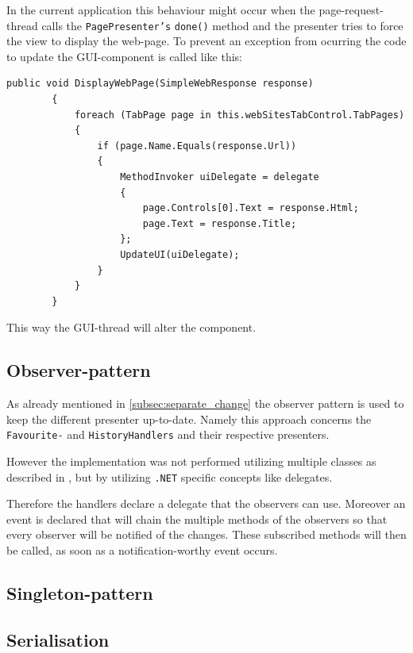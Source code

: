 In the current application this behaviour might occur when the page-request-thread calls the \texttt{PagePresenter's} \texttt{done()} method and the presenter tries to force the view to display the web-page.
To prevent an exception from ocurring the code to update the \ac{GUI}-component is called like this:

\begin{lstlisting}
public void DisplayWebPage(SimpleWebResponse response)
        {
            foreach (TabPage page in this.webSitesTabControl.TabPages)
            {
                if (page.Name.Equals(response.Url))
                {
                    MethodInvoker uiDelegate = delegate
                    {
                        page.Controls[0].Text = response.Html;
                        page.Text = response.Title;
                    };
                    UpdateUI(uiDelegate);
                }
            }
        }
\end{lstlisting}

This way the \ac{GUI}-thread will alter the component.

\subsection{Observer-pattern}

As already mentioned in \autoref{subsec:separate_change} the observer pattern is used to keep the different presenter up-to-date.
Namely this approach concerns the \texttt{Favourite-} and \texttt{HistoryHandlers} and their respective presenters.

However the implementation was not performed utilizing multiple classes as described in \textcite{gamma1994}, but by utilizing \texttt{.NET} specific concepts like delegates.

Therefore the handlers declare a delegate that the observers can use.
Moreover an event is declared that will chain the multiple methods of the observers so that every observer will be notified of the changes.
These subscribed methods will then be called, as soon as a notification-worthy event occurs.


\subsection{Singleton-pattern}



\subsection{Serialisation}

